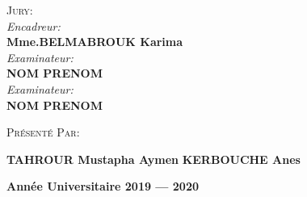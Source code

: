 \documentclass[12pt, openany]{report}
\begin{document}
\begin{titlepage}
\begin{sffamily}
\begin{center}
    \begin{minipage}{0.45\textwidth}
      \begin{flushleft} \large
        \textsc{\Large Jury:}\\[0.5cm]
        \textit{Encadreur:}\\  
        \textbf{Mme.BELMABROUK Karima}\\
        \textit{Examinateur:}\\
        \textbf{NOM PRENOM}\\
        \textit{Examinateur:}\\
        \textbf{NOM PRENOM}
      \end{flushleft} 
    \end{minipage}
    \begin{minipage}{0.4\textwidth}
      \begin{flushleft} 
        \textsc{\Large Présenté Par:}\\
        \end{flushleft}
        \begin{flushright}
        \begin{flushleft} 
        \textbf{\large TAHROUR Mustapha Aymen}
        \textbf{\large KERBOUCHE Anes}\\
         \end{flushleft}
      \end{flushright}
    \end{minipage}

    \vfill

    \textbf{\large Année Universitaire 2019 — 2020 }
  \end{center}
  \end{sffamily}
\end{titlepage}
\end{document}

